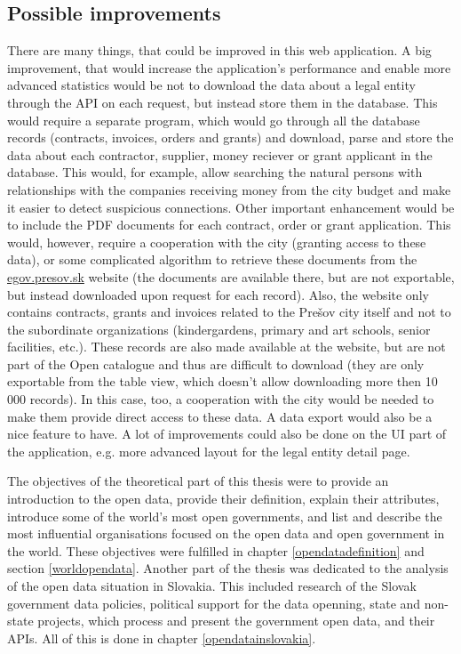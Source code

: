 \documentclass[thesis=B,english]{sprlajur-slovakopendata}[2018/05/12]
\begin{document}
{	\subsection{Possible improvements}
	There are many things, that could be improved in this web application. A big improvement, that would increase the application's performance and enable more advanced statistics would be not to download the data about a legal entity through the API on each request, but instead store them in the database. This would require a separate program, which would go through all the database records (contracts, invoices, orders and grants) and download, parse and store the data about each contractor, supplier, money reciever or grant applicant in the database. This would, for example, allow searching the natural persons with relationships with the companies receiving money from the city budget and make it easier to detect suspicious connections. Other important enhancement would be to include the PDF documents for each contract, order or grant application. This would, however, require a cooperation with the city (granting access to these data), or some complicated algorithm to retrieve these documents from the \url{egov.presov.sk} website (the documents are available there, but are not exportable, but instead downloaded upon request for each record). Also, the website only contains contracts, grants and invoices related to the Prešov city itself and not to the subordinate organizations (kindergardens, primary and art schools, senior facilities, etc.). These records are also made available at the website, but are not part of the Open catalogue and thus are difficult to download (they are only exportable from the table view, which doesn't allow downloading more then 10 000 records). In this case, too, a cooperation with the city would be needed to make them provide direct access to these data. A data export would also be a nice feature to have. A lot of improvements could also be done on the UI part of the application, e.g. more advanced layout for the legal entity detail page.
	\begin{conclusion}
		The objectives of the theoretical part of this thesis were to provide an introduction to the open data, provide their definition, explain their attributes, introduce some of the world's most open governments, and list and describe the most influential organisations focused on the open data and open government in the world. These objectives were fulfilled in chapter \ref{opendatadefinition} and section \ref{worldopendata}. Another part of the thesis was dedicated to the analysis of the open data situation in Slovakia. This included research of the Slovak government data policies, political support for the data openning, state and non-state projects, which process and present the government open data, and their APIs. All of this is done in chapter \ref{opendatainslovakia}.

\end{conclusion}}
\end{document}

